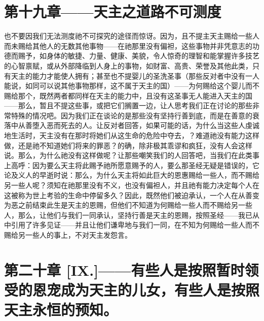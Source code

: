 
\section{第十九章——天主之道路不可测度}

也不要因我们无法测度祂不可探究的途径而惊讶。因为，且不提主天主赐给一些人而未赐给其他人的无数其他事物——在祂那里没有偏袒，这些事物并非凭意志的功德而赐予，如身体的敏捷、力量、健康、美貌，令人惊奇的理智和能掌握许多技艺的心智禀赋，或从外部降临到人身上的事物，如财富、高贵、荣誉及其他此类，只有天主的能力才能使人拥有；甚至也不提婴儿的圣洗圣事（那些反对者中没有一人能说，如同可以说其他事物那样，这不属于天主的国）——为何赐给这个婴儿而不赐给那个，既然两者都同样在天主的能力中，且没有这圣事无人能进入天主的国——那么，暂且不提这些事，或把它们搁置一边，让人思考我们正在讨论的那些非常特殊的情况吧。因为我们正在谈论的是那些没有坚持行善到底，而是在善意的衰落中从善堕入恶而死去的人。让反对者回答，如果可能的话，为什么当这些人虔诚地生活时，天主没有在那时将她们从这生命的危险中夺去，？难道祂没有能力这样做，还是祂不知道她们将来的罪恶？的确，除非极其乖谬和疯狂，没有人会这样说。那么，为什么祂没有这样做呢？让那些嘲笑我们的人回答吧，当我们在此类事上高呼：因为要么天主将此赐予祂所愿意赐予的人，要么那圣经无疑是错误的，它论及义人的早逝时说：那么，为什么天主将如此巨大的恩惠赐给一些人，而不赐给另一些人呢？须知在祂那里没有不义，也没有偏袒人，并且祂有能力决定每个人在这被称为世上考验的生命中停留多久？因此，既然他们被迫承认，一个人在从善变为恶之前结束此生是天主的恩赐，但他们不知道为何赐给一些人而不赐给另一些人，那么，让他们与我们一同承认，坚持行善是天主的恩赐，按照圣经——我已从中引用了许多见证——并且让他们谦卑地与我们一同，在不知为何赐给一些人而不赐给另一些人的事上，不对天主发怨言。\par


\section{第二十章 [IX.]——有些人是按照暂时领受的恩宠成为天主的儿女，有些人是按照天主永恒的预知。}

